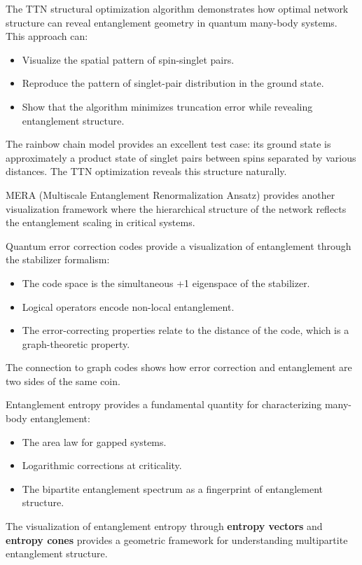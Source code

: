 \documentclass[%
 amsmath,amssymb,
 aps,
rmp,
]{revtex4-2}
\begin{document}
The TTN structural optimization algorithm \cite{Hikihara2024} demonstrates how optimal network structure can reveal entanglement geometry in quantum many-body systems. This approach can:
\begin{itemize}
	\item Visualize the spatial pattern of spin-singlet pairs.
	\item Reproduce the pattern of singlet-pair distribution in the ground state.
	\item Show that the algorithm minimizes truncation error while revealing entanglement structure.
\end{itemize}

The rainbow chain model provides an excellent test case: its ground state is approximately a product state of singlet pairs between spins separated by various distances. The TTN optimization reveals this structure naturally.

MERA (Multiscale Entanglement Renormalization Ansatz) provides another visualization framework where the hierarchical structure of the network reflects the entanglement scaling in critical systems.

Quantum error correction codes provide a visualization of entanglement through the stabilizer formalism:
\begin{itemize}
	\item The code space is the simultaneous +1 eigenspace of the stabilizer.
	\item Logical operators encode non-local entanglement.
	\item The error-correcting properties relate to the distance of the code, which is a graph-theoretic property.
\end{itemize}

The connection to graph codes shows how error correction and entanglement are two sides of the same coin.

Entanglement entropy provides a fundamental quantity for characterizing many-body entanglement:
\begin{itemize}
	\item The area law for gapped systems.
	\item Logarithmic corrections at criticality.
	\item The bipartite entanglement spectrum as a fingerprint of entanglement structure.
\end{itemize}

The visualization of entanglement entropy through \textbf{entropy vectors} and \textbf{entropy cones} provides a geometric framework for understanding multipartite entanglement structure.
\end{document}
